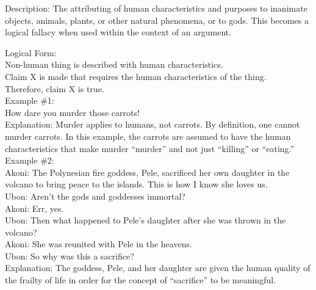 \documentclass[a4paper,12pt,single,pdftex]{scrartcl}
\begin{document}
  
    Description: The attributing of human characteristics and purposes to inanimate objects, animals, plants, or other natural phenomena, or to gods. This becomes a logical fallacy when used within the context of an argument.

    
      Logical Form:
    \\

    
      Non-human thing is described with human characteristics.
    \\

    
      Claim X is made that requires the human characteristics of the thing.
    \\

    
      Therefore, claim X is true.
    \\

    
      Example \#1:
    \\

    
      How dare you murder those carrots!
    \\

    
      Explanation: Murder applies to humans, not carrots. By definition, one cannot murder carrots. In this example, the carrots are assumed to have the human characteristics that make murder “murder” and not just “killing” or “eating.”
    \\

    
      Example \#2:
    \\

    
      Akoni: The Polynesian fire goddess, Pele, sacrificed her own daughter in the volcano to bring peace to the islands. This is how I know she loves us.
    \\

    
      Ubon: Aren't the gods and goddesses immortal?
    \\

    
      Akoni: Err, yes.
    \\

    
      Ubon: Then what happened to Pele's daughter after she was thrown in the volcano?
    \\

    
      Akoni: She was reunited with Pele in the heavens.
    \\

    
      Ubon: So why was this a sacrifice?
    \\

    
      Explanation: The goddess, Pele, and her daughter are given the human quality of the frailty of life in order for the concept of “sacrifice” to be meaningful.
    \\
\end{document}
